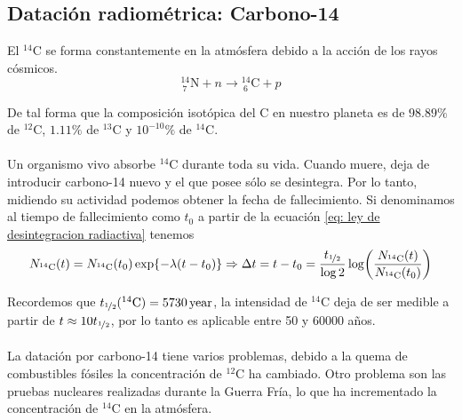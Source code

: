 \subsection{Datación radiométrica: Carbono-14}

El $^{14}\mathrm{C}$ se forma constantemente en la atmósfera debido a la acción de los rayos cósmicos. $$ _{\ 7}^{14}\mathrm{N} +n \longrightarrow{} _{\ 6} ^{14} \mathrm{C}+p$$

De tal forma que la composición isotópica del C en nuestro planeta es de $98.89\%$ de $^{12}\mathrm{C}$, $1.11\%$ de $^{13}\mathrm{C}$ y $10^{-10}\%$ de $^{14}\mathrm{C}$.\\\\
Un organismo vivo absorbe $^{14}\mathrm{C}$ durante toda su vida. Cuando muere, deja de introducir carbono-14 nuevo y el que posee sólo se desintegra. Por lo tanto, midiendo su actividad podemos obtener la fecha de fallecimiento. Si denominamos al tiempo de fallecimiento como $t_0$ a partir de la ecuación \ref{eq: ley de desintegracion radiactiva} tenemos 
$$N_{^{14}\mathrm{C}}(t)=N_{^{14}\mathrm{C}}(t_0) \exp{-\lambda (t-t_0)} \Rightarrow \Delta t= t-t_0= \frac{t_{\nicefrac{1}{2}}}{\log 2} \log(\frac{N_{^{14}\mathrm{C}}(t)}{N_{^{14}\mathrm{C}}(t_0)})$$

Recordemos que $t_{\nicefrac{1}{2}}({}^{14}\mathrm{C})=\unit[5730]{year}$, la intensidad de $^{14}\mathrm{C}$ deja de ser medible a partir de $t\approx 10 t_{\nicefrac{1}{2}}$, por lo tanto es aplicable entre 50 y 60000 años.\\\\ La datación por carbono-14 tiene varios problemas, debido a la quema de combustibles fósiles la concentración de $^{12}\mathrm{C}$ ha cambiado. Otro problema son las pruebas nucleares realizadas durante la Guerra Fría, lo que ha incrementado la concentración de $^{14}\mathrm{C}$ en la atmósfera.

